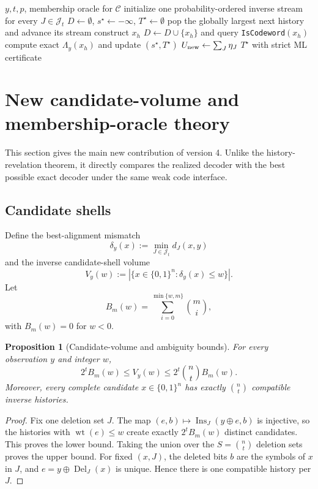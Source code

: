 \documentclass[11pt]{article}
\newtheorem{proposition}{Proposition}
\theoremstyle{definition}
\theoremstyle{remark}
\newcommand{\C}{\mathcal C}
\newcommand{\J}{\mathcal J}
\begin{document}
\begin{algorithm}[t]
\caption{Membership-first certified FIBER search}
\begin{algorithmic}[1]
\Require $y,t,p$, membership oracle for $\C$
\State initialize one probability-ordered inverse stream for every $J\in\J_t$
\State $D\gets\emptyset$, $s^\star\gets-\infty$, $T^\star\gets\emptyset$
  \State pop the globally largest next history and advance its stream
  \State construct $x_h$
    \State $D\gets D\cup\{x_h\}$ and query \texttt{IsCodeword}$(x_h)$
    \If{$x_h\in\C$}
      \State compute exact $\Lambda_y(x_h)$ and update $(s^\star,T^\star)$
    \EndIf
  \EndIf
  \State $U_{\rm new}\gets\sum_J\eta_J$
    \State \Return $T^\star$ with strict ML certificate
  \EndIf
\EndWhile
\end{algorithmic}
\end{algorithm}

\section{New candidate-volume and membership-oracle theory}
This section gives the main new contribution of version 4.  Unlike the history-revelation theorem, it directly compares the realized decoder with the best possible exact decoder under the same weak code interface.

\subsection{Candidate shells}
Define the best-alignment mismatch
\[
\delta_y(x):=\min_{J\in\J_t}d_J(x,y)
\]
and the inverse candidate-shell volume
\[
V_y(w):=\left|\{x\in\{0,1\}^n:\delta_y(x)\le w\}\right|.
\]
Let
\[
B_m(w)=\sum_{i=0}^{\min\{w,m\}}\binom mi,
\]
with $B_m(w)=0$ for $w<0$.

\begin{proposition}[Candidate-volume and ambiguity bounds]
\label{prop:volume}
For every observation $y$ and integer $w$,
\begin{equation}
2^tB_m(w)\le V_y(w)\le 2^t\binom nt B_m(w).
\label{eq:volume}
\end{equation}
Moreover, every complete candidate $x\in\{0,1\}^n$ has exactly $\binom nt$ compatible inverse histories.
\end{proposition}
\begin{proof}
Fix one deletion set $J$.  The map $(e,b)\mapsto\operatorname{Ins}_J(y\oplus e,b)$ is injective, so the histories with $\operatorname{wt}(e)\le w$ create exactly $2^tB_m(w)$ distinct candidates.  This proves the lower bound.  Taking the union over the $S=\binom nt$ deletion sets proves the upper bound.  For fixed $(x,J)$, the deleted bits $b$ are the symbols of $x$ in $J$, and $e=y\oplus\operatorname{Del}_J(x)$ is unique.  Hence there is one compatible history per $J$.
\end{proof}
\end{document}
